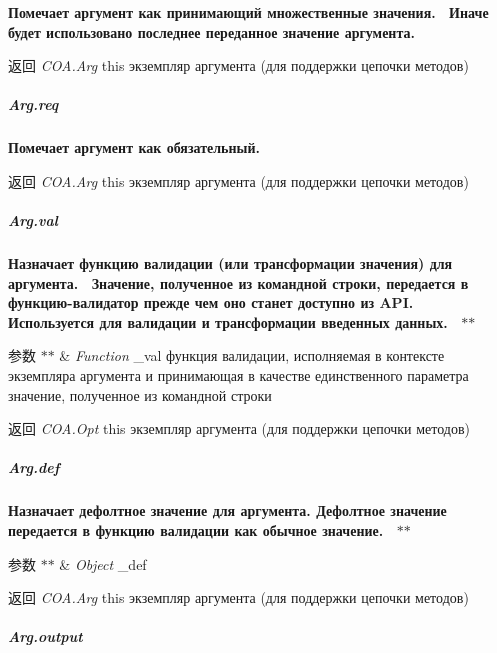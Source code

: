 {\bfseries {\bfseries {\bfseries {\bfseries {\bfseries {\bfseries {\bfseries  Помечает аргумент как принимающий множественные значения.~\newline
 Иначе будет использовано последнее переданное значение аргумента.~\newline
 {\bfseries \begin{DoxyReturn}{返回}
{\itshape C\+O\+A.\+Arg} {\ttfamily this} экземпляр аргумента (для поддержки цепочки методов)
\end{DoxyReturn}
\subparagraph*{Arg.\+req}}}}}}}}}

{\bfseries {\bfseries {\bfseries {\bfseries {\bfseries {\bfseries {\bfseries {\bfseries  Помечает аргумент как обязательный.~\newline
 {\bfseries \begin{DoxyReturn}{返回}
{\itshape C\+O\+A.\+Arg} {\ttfamily this} экземпляр аргумента (для поддержки цепочки методов)
\end{DoxyReturn}
\subparagraph*{Arg.\+val}}}}}}}}}}

{\bfseries {\bfseries {\bfseries {\bfseries {\bfseries {\bfseries {\bfseries {\bfseries {\bfseries  Назначает функцию валидации (или трансформации значения) для аргумента.~\newline
 Значение, полученное из командной строки, передается в функцию-\/валидатор прежде чем оно станет доступно из A\+PI.~\newline
 Используется для валидации и трансформации введенных данных.~\newline
 $\ast$$\ast$
\begin{DoxyParams}{参数}
{\em $\ast$$\ast$} & {\itshape Function} {\ttfamily \+\_\+val} функция валидации, исполняемая в контексте экземпляра аргумента и принимающая в качестве единственного параметра значение, полученное из командной строки~\newline
 {\bfseries }\\
\hline
\end{DoxyParams}
\begin{DoxyReturn}{返回}
{\bfseries } {\itshape C\+O\+A.\+Opt} {\ttfamily this} экземпляр аргумента (для поддержки цепочки методов)
\end{DoxyReturn}
\subparagraph*{Arg.\+def}}}}}}}}}}

{\bfseries {\bfseries {\bfseries {\bfseries {\bfseries {\bfseries {\bfseries {\bfseries {\bfseries  Назначает дефолтное значение для аргумента. Дефолтное значение передается в функцию валидации как обычное значение.~\newline
 $\ast$$\ast$
\begin{DoxyParams}{参数}
{\em $\ast$$\ast$} & {\itshape Object} {\ttfamily \+\_\+def}~\newline
 {\bfseries }\\
\hline
\end{DoxyParams}
\begin{DoxyReturn}{返回}
{\bfseries } {\itshape C\+O\+A.\+Arg} {\ttfamily this} экземпляр аргумента (для поддержки цепочки методов)
\end{DoxyReturn}
\subparagraph*{Arg.\+output}}}}}}}}}}

